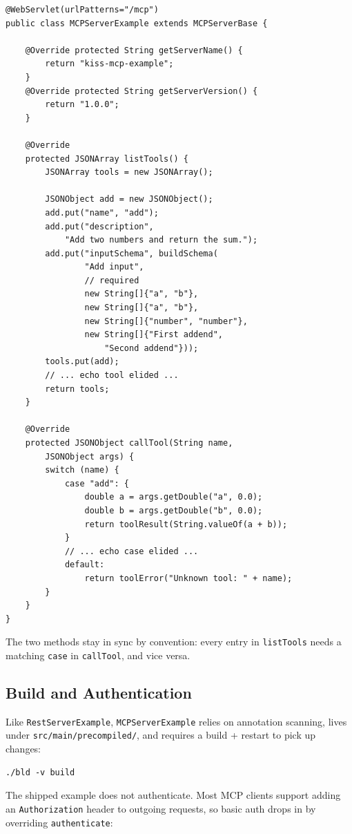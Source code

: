 \begin{lstlisting}[style=java]
@WebServlet(urlPatterns="/mcp")
public class MCPServerExample extends MCPServerBase {

    @Override protected String getServerName() {
        return "kiss-mcp-example";
    }
    @Override protected String getServerVersion() {
        return "1.0.0";
    }

    @Override
    protected JSONArray listTools() {
        JSONArray tools = new JSONArray();

        JSONObject add = new JSONObject();
        add.put("name", "add");
        add.put("description",
            "Add two numbers and return the sum.");
        add.put("inputSchema", buildSchema(
                "Add input",
                // required
                new String[]{"a", "b"},
                new String[]{"a", "b"},
                new String[]{"number", "number"},
                new String[]{"First addend",
                    "Second addend"}));
        tools.put(add);
        // ... echo tool elided ...
        return tools;
    }

    @Override
    protected JSONObject callTool(String name,
        JSONObject args) {
        switch (name) {
            case "add": {
                double a = args.getDouble("a", 0.0);
                double b = args.getDouble("b", 0.0);
                return toolResult(String.valueOf(a + b));
            }
            // ... echo case elided ...
            default:
                return toolError("Unknown tool: " + name);
        }
    }
}
\end{lstlisting}

\noindent
The two methods stay in sync by convention: every entry in \texttt{listTools} needs a matching \texttt{case} in \texttt{callTool}, and vice versa.

\subsection{Build and Authentication}

Like \texttt{RestServerExample}, \texttt{MCPServerExample} relies on annotation scanning, lives under \texttt{src/main/pre\-compiled/}, and requires a build + restart to pick up changes:

\begin{lstlisting}[style=shell]
./bld -v build
\end{lstlisting}

\noindent
The shipped example does not authenticate.  Most MCP clients support adding an \texttt{Authorization} header to outgoing requests, so basic auth drops in by overriding \texttt{authenticate}:

